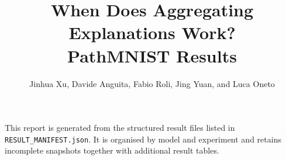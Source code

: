 \documentclass[10pt,a4paper]{article}
\title{When Does Aggregating Explanations Work?\\\large PathMNIST Results}
\author{Jinhua Xu, Davide Anguita, Fabio Roli, Jing Yuan, and Luca Oneto}
\date{}
\begin{document}
\maketitle

\noindent
This report is generated from the structured result files listed in
\texttt{RESULT\_MANIFEST.json}. It is organised by model and experiment
and retains incomplete snapshots together with additional result tables.


\end{document}
